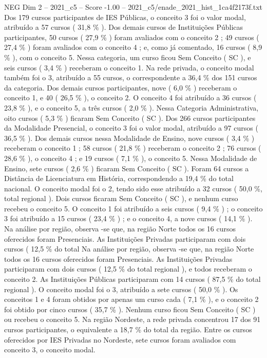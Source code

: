 \begin{textsample}{NEG Dim 2 – 2021\_c5 – Score -1.00 – 2021\_c5/enade\_2021\_hist\_1ca4f2173f.txt}
Dos 179 cursos participantes de IES Públicas, o conceito 3 foi o valor modal, atribuído a 57 cursos ( 31,8 \% ).
Dos demais cursos de Instituições Públicas participantes, 50 cursos ( 27,9 \% ) foram avaliados com o conceito 2 ; 49 cursos ( 27,4 \% ) foram avaliados com o conceito 4 ; e, como já comentado, 16 cursos ( 8,9 \% ), com o conceito 5.
Nessa categoria, um curso ficou Sem Conceito ( SC ), e seis cursos ( 3,4 \% ) receberam o conceito 1.
Na rede privada, o conceito modal também foi o 3, atribuído a 55 cursos, o correspondente a 36,4 \% dos 151 cursos da categoria.
Dos demais cursos participantes, nove ( 6,0 \% ) receberam o conceito 1, e 40 ( 26,5 \% ), o conceito 2.
O conceito 4 foi atribuído a 36 cursos ( 23,8 \% ), e o conceito 5, a três cursos ( 2,0 \% ).
Nessa Categoria Administrativa, oito cursos ( 5,3 \% ) ficaram Sem Conceito ( SC ).
Dos 266 cursos participantes da Modalidade Presencial, o conceito 3 foi o valor modal, atribuído a 97 cursos ( 36,5 \% ).
Dos demais cursos nessa Modalidade de Ensino, nove cursos ( 3,4 \% ) receberam o conceito 1 ; 58 cursos ( 21,8 \% ) receberam o conceito 2 ; 76 cursos ( 28,6 \% ), o conceito 4 ; e 19 cursos ( 7,1 \% ), o conceito 5.
Nessa Modalidade de Ensino, sete cursos ( 2,6 \% ) ficaram Sem Conceito ( SC ).
Foram 64 cursos a Distância de Licenciatura em História, correspondendo a 19,4 \% do total nacional.
O conceito modal foi o 2, tendo sido esse atribuído a 32 cursos ( 50,0 \%, total regional ).
Dois cursos ficaram Sem Conceito ( SC ), e nenhum curso recebeu o conceito 5.
O conceito 1 foi atribuído a seis cursos ( 9,4 \% ) ; o conceito 3 foi atribuído a 15 cursos ( 23,4 \% ) ; e o conceito 4, a nove cursos ( 14,1 \% ).
Na análise por região, observa -se que, na região Norte todos os 16 cursos oferecidos foram Presenciais.
As Instituições Privadas participaram com dois cursos ( 12,5 \% do total Na análise por região, observa -se que, na região Norte todos os 16 cursos oferecidos foram Presenciais.
As Instituições Privadas participaram com dois cursos ( 12,5 \% do total regional ), e todos receberam o conceito 2.
As Instituições Públicas participaram com 14 cursos ( 87,5 \% do total regional ).
O conceito modal foi o 3, atribuído a sete cursos ( 50,0 \% ).
Os conceitos 1 e 4 foram obtidos por apenas um curso cada ( 7,1 \% ), e o conceito 2 foi obtido por cinco cursos ( 35,7 \% ).
Nenhum curso ficou Sem Conceito ( SC ) ou recebeu o conceito 5.
Na região Nordeste, a rede privada concentrou 17 dos 91 cursos participantes, o equivalente a 18,7 \% do total da região.
Entre os cursos oferecidos por IES Privadas no Nordeste, sete cursos foram avaliados com conceito 3, o conceito modal.

\end{textsample}
